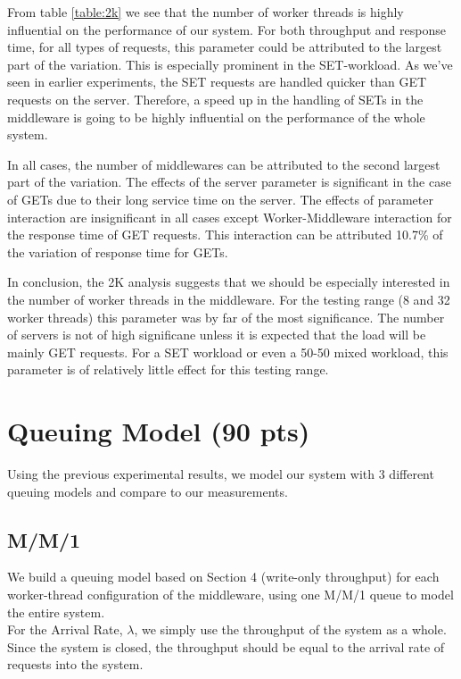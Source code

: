 \documentclass[11pt,a4paper]{article}
\begin{document}
From table \ref{table:2k} we see that the number of worker threads is highly influential on the performance of our system. For both throughput and response time, for all types of requests, this parameter could be attributed to the largest part of the variation. This is especially prominent in the SET-workload. As we've seen in earlier experiments, the SET requests are handled quicker than GET requests on the server. Therefore, a speed up in the handling of SETs in the middleware is going to be highly influential on the performance of the whole system.

In all cases, the number of middlewares can be attributed to the second largest part of the variation. The effects of the server parameter is significant in the case of GETs due to their long service time on the server. The effects of parameter interaction are insignificant in all cases except Worker-Middleware interaction for the response time of GET requests. This interaction can be attributed 10.7\% of the variation of response time for GETs. 

In conclusion, the 2K analysis suggests that we should be especially interested in the number of worker threads in the middleware. For the testing range (8 and 32 worker threads) this parameter was by far of the most significance. The number of servers is not of high significane unless it is expected that the load will be mainly GET requests. For a SET workload or even a 50-50 mixed workload, this parameter is of relatively little effect for this testing range.

\section{Queuing Model (90 pts)}

Using the previous experimental results, we model our system with 3 different queuing models and compare to our measurements.

\subsection{M/M/1}

We build a queuing model based on Section 4 (write-only throughput) for each worker-thread configuration of the middleware, using one M/M/1 queue to model the entire system.\\

For the Arrival Rate, $\lambda$, we simply use the throughput of the system as a whole. Since the system is closed, the throughput should be equal to the arrival rate of requests into the system.
\end{document}
